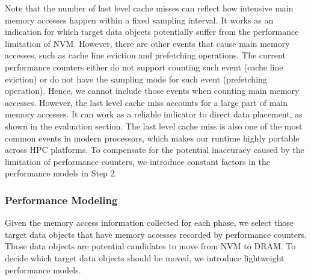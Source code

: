 Note that the number of last level cache misses can reflect how intensive main memory accesses happen within a fixed sampling interval.
It works as an indication for which target data objects potentially suffer from the performance limitation of NVM. 
However, there are other events that cause main memory accesses, such as cache line eviction and prefetching operations.
The current performance counters either do not support counting such event (cache line eviction) or do not have the sampling mode
for such event (prefetching operation). Hence, we cannot include those events when counting main memory accesses. %
However, the last level cache miss accounts for a large part of main memory accesses.
It can work as a reliable indicator to direct data placement, as shown in the evaluation section. The last level cache miss is also one of the most common events in modern processors, which makes our runtime highly portable across HPC platforms. To compensate for the potential inaccuracy caused by the limitation of performance counters, we introduce constant factors in the performance models in Step 2. 
\vspace{-5pt}
\begin{comment}
    "The stall latency of each access in a modern superscalar processor
    is not the same as the time to access memory. The
    processor can hide the latency to access memory by locating
    multiple memory requests in the instruction stream and
    then using out-of-order execution to issue them in parallel
    to memory via non-blocking caches [39]. In addition, microprocessors
    incorporate prefetchers that locate striding accesses
    in the stream of addresses originating from execution
    and prefetch ahead. As a result the effective latency to access
    memory can be much smaller than the actual physical
    latency for certain access patterns. "
    my comments: "the effects of prefetching is not measured in our HW events,
    because the prefetching does not have instructions.
    streaming access patterns can benefit from prefetching."
\end{comment}

\subsubsection{Performance Modeling}
Given the memory access information collected for each phase, 
we select those target data objects that have memory accesses 
recorded by performance counters. Those data objects are potential candidates to move from NVM to DRAM.
To decide which target data objects should be moved,
we introduce lightweight performance models.

